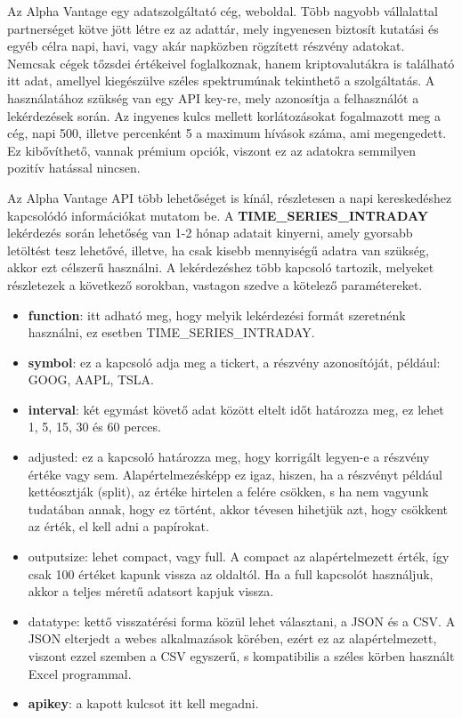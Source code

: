 \newpage

\label{alphavantage}
Az Alpha Vantage egy adatszolgáltató cég, weboldal. Több nagyobb vállalattal partnerséget kötve jött létre ez az adattár, mely ingyenesen biztosít kutatási és egyéb célra napi, havi, vagy akár napközben rögzített részvény adatokat. Nemcsak cégek tőzsdei értékeivel foglalkoznak, hanem kriptovalutákra is található itt adat, amellyel kiegészülve széles spektrumúnak tekinthető a szolgáltatás. A használatához szükség van egy API key-re, mely azonosítja a felhasználót a lekérdezések során. Az ingyenes kulcs mellett korlátozásokat fogalmazott meg a cég, napi 500, illetve percenként 5 a maximum hívások száma, ami megengedett. Ez kibővíthető, vannak prémium opciók, viszont ez az adatokra semmilyen pozitív hatással nincsen.

Az Alpha Vantage API több lehetőséget is kínál, részletesen a napi kereskedéshez kapcsolódó információkat mutatom be. A \textbf{TIME\_SERIES\_INTRADAY} lekérdezés során lehetőség van 1-2 hónap adatait kinyerni, amely gyorsabb letöltést tesz lehetővé, illetve, ha csak kisebb mennyiségű adatra van szükség, akkor ezt célszerű használni. A lekérdezéshez több kapcsoló tartozik, melyeket részletezek a következő sorokban, vastagon szedve a kötelező paramétereket.

\begin{itemize}
  \item \textbf{function}: itt adható meg, hogy melyik lekérdezési formát szeretnénk használni, ez esetben TIME\_SERIES\_INTRADAY.
  \item \textbf{symbol}: ez a kapcsoló adja meg a tickert, a részvény azonosítóját, például: GOOG, AAPL, TSLA.
  \item \textbf{interval}: két egymást követő adat között eltelt időt határozza meg, ez lehet 1, 5, 15, 30 és 60 perces.
  \item adjusted: ez a kapcsoló határozza meg, hogy korrigált legyen-e a részvény értéke vagy sem. Alapértelmezésképp ez igaz, hiszen, ha a részvényt például kettéosztják (split), az értéke hirtelen a felére csökken, s ha nem vagyunk tudatában annak, hogy ez történt, akkor tévesen hihetjük azt, hogy csökkent az érték, el kell adni a papírokat.
  \item outputsize: lehet compact, vagy full. A compact az alapértelmezett érték, így csak 100 értéket kapunk vissza az oldaltól. Ha a full kapcsolót használjuk, akkor a teljes méretű adatsort kapjuk vissza.
  \item datatype: kettő visszatérési forma közül lehet választani, a JSON és a CSV. A JSON elterjedt a webes alkalmazások körében, ezért ez az alapértelmezett, viszont ezzel szemben a CSV egyszerű, s kompatibilis a széles körben használt Excel programmal.
  \item \textbf{apikey}: a kapott kulcsot itt kell megadni.
\end{itemize}

